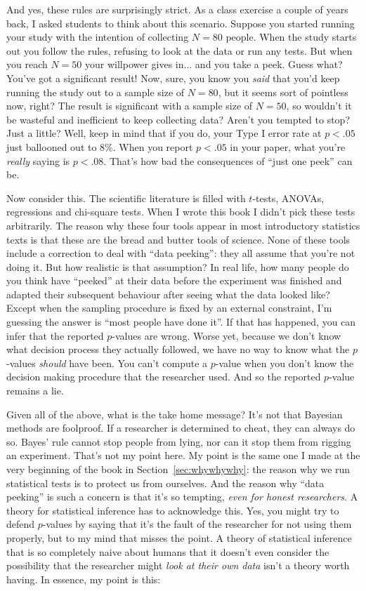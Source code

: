 And yes, these rules are surprisingly strict. As a class exercise a couple of years back, I asked students to think about this scenario. Suppose you started running your study with the intention of collecting $N=80$ people. When the study starts out you follow the rules, refusing to look at the data or run any tests. But when you reach $N=50$ your willpower gives in... and you take a peek. Guess what? You've got a significant result! Now, sure, you know you {\it said} that you'd keep running the study out to a sample size of $N=80$, but it seems sort of pointless now, right? The result is significant with a sample size of $N=50$, so wouldn't it be wasteful and inefficient to keep collecting data? Aren't you tempted to stop? Just a little? Well, keep in mind that if you do, your Type I error rate at $p<.05$ just ballooned out to 8\%. When you report $p<.05$ in your paper, what you're {\it really} saying is $p<.08$. That's how bad the consequences of ``just one peek'' can be.

Now consider this. The scientific literature is filled with $t$-tests, ANOVAs, regressions and chi-square tests. When I wrote this book I didn't pick these tests arbitrarily. The reason why these four tools appear in most introductory statistics texts is that these are the bread and butter tools of science. None of these tools include a correction to deal with ``data peeking'': they all assume that you're not doing it. But how realistic is that assumption? In real life, how many people do you think have ``peeked'' at their data before the experiment was finished and adapted their subsequent behaviour after seeing what the data looked like? Except when the sampling procedure is fixed by an external constraint, I'm guessing the answer is ``most people have done it''. If that has happened, you can infer that the reported $p$-values are wrong. Worse yet, because we don't know what decision process they actually followed, we have no way to know what the $p$-values {\it should} have been. You can't compute a $p$-value when you don't know the decision making procedure that the researcher used. And so the reported $p$-value remains a lie. 

Given all of the above, what is the take home message? It's not that Bayesian methods are foolproof. If a researcher is determined to cheat, they can always do so. Bayes' rule cannot stop people from lying, nor can it stop them from rigging an experiment. That's not my point here. My point is the same one I made at the very beginning of the book in Section~\ref{sec:whywhywhy}: the reason why we run statistical tests is to protect us from ourselves. And the reason why ``data peeking'' is such a concern is that it's so tempting, {\it even for honest researchers}. A theory for statistical inference has to acknowledge this. Yes, you might try to defend $p$-values by saying that it's the fault of the researcher for not using them properly, but to my mind that misses the point. A theory of statistical inference that is so completely naive about humans that it doesn't even consider the possibility that the researcher might {\it look at their own data} isn't a theory worth having. In essence, my point is this:

